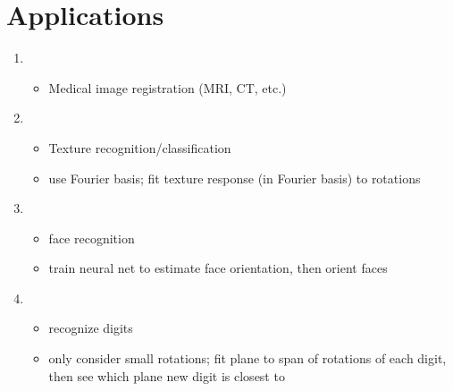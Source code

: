 \documentclass[12pt]{article}
\begin{document}
\section{Applications}

\begin{enumerate}

\item {}
\begin{itemize}
	\item Medical image registration (MRI, CT, etc.)
\end{itemize}

\item {}
\begin{itemize}
\item Texture recognition/classification
\item use Fourier basis; fit texture response (in Fourier basis) to rotations 
\end{itemize}

\item {}
\begin{itemize}
	\item face recognition
	\item train neural net to estimate face orientation, then orient faces
\end{itemize}

\item {}
\begin{itemize}
	\item recognize digits
	\item only consider small rotations; fit plane to span of rotations of each digit, then see which plane new digit is closest to
\end{itemize}

\end{enumerate}
\end{document}
